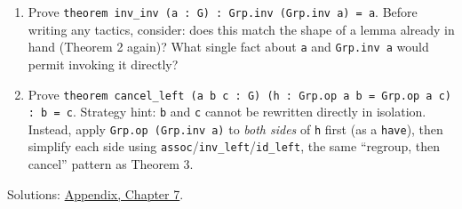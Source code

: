 \begin{enumerate}
\item
  Prove \texttt{theorem inv\_\allowbreak{}inv (a : G) : Grp.inv (Grp.inv a) = a}. Before writing any tactics, consider: does this match the shape of a lemma already in hand (Theorem 2 again)? What single fact about \texttt{a} and \texttt{Grp.inv a} would permit invoking it directly?
\item
  Prove \texttt{theorem cancel\_\allowbreak{}left (a b c : G) (h : Grp.op a b = Grp.op a c) : b = c}. Strategy hint: \texttt{b} and \texttt{c} cannot be rewritten directly in isolation. Instead, apply \texttt{Grp.op (Grp.inv a)} to \emph{both sides} of \texttt{h} first (as a \texttt{have}), then simplify each side using \texttt{assoc}/\texttt{inv\_\allowbreak{}left}/\texttt{id\_\allowbreak{}left}, the same ``regroup, then cancel'' pattern as Theorem 3.
\end{enumerate}

Solutions: \hyperref[sec:14-appendix-solutions:06-chapter-7:1]{Appendix, Chapter 7}.


